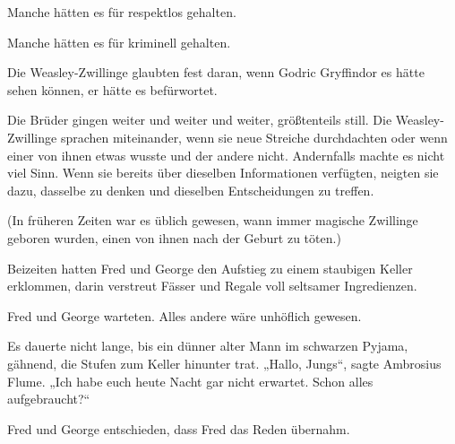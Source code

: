 Manche hätten es für respektlos gehalten.

Manche hätten es für kriminell gehalten.

Die Weasley-Zwillinge glaubten fest daran, wenn Godric Gryffindor es hätte sehen können, er hätte es befürwortet.

Die Brüder gingen weiter und weiter und weiter, größtenteils still. Die Weasley-Zwillinge sprachen miteinander, wenn sie neue Streiche durchdachten oder wenn einer von ihnen etwas wusste und der andere nicht. Andernfalls machte es nicht viel Sinn. Wenn sie bereits über dieselben Informationen verfügten, neigten sie dazu, dasselbe zu denken und dieselben Entscheidungen zu treffen.

(In früheren Zeiten war es üblich gewesen, wann immer magische Zwillinge geboren wurden, einen von ihnen nach der Geburt zu töten.)

Beizeiten hatten Fred und George den Aufstieg zu einem staubigen Keller erklommen, darin verstreut Fässer und Regale voll seltsamer Ingredienzen.

Fred und George warteten. Alles andere wäre unhöflich gewesen.

Es dauerte nicht lange, bis ein dünner alter Mann im schwarzen Pyjama, gähnend, die Stufen zum Keller hinunter trat. „Hallo, Jungs“, sagte Ambrosius Flume. „Ich habe euch heute Nacht gar nicht erwartet. Schon alles aufgebraucht?“

Fred und George entschieden, dass Fred das Reden übernahm.

